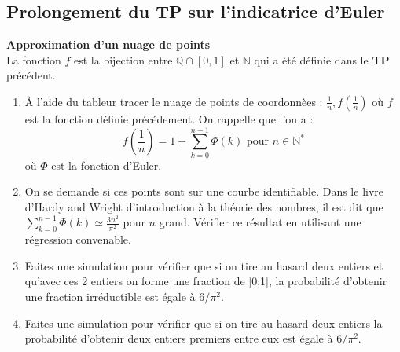 \documentclass[a4paper,11pt]{book}
\newcommand{\Q}{{\mathbb{Q}}}
\newcommand{\N}{{\mathbb{N}}}
\begin{document}
\subsection{Prolongement du {\bf TP} sur l'indicatrice d'Euler}
{\bf Approximation d'un nuage de points} \\
La fonction $f$ est la bijection entre $\Q \cap [0,1]$ et $\N$ qui a \`et\'e 
d\'efinie dans le {\bf TP} pr\'ec\'edent.
\begin{enumerate}
\item \`A l'aide du tableur tracer le nuage de points de coordonn\`ees :
$\displaystyle \frac{1}{n},f(\frac{1}{n})$ o\`u $f$ est la fonction d\'efinie 
pr\'ec\'edement. On rappelle que l'on a :\\
$$f(\frac{1}{n})=1+\sum_{k=0}^{n-1}\Phi(k) \mbox{ pour } n\in \N^*$$
o\`u $\Phi$ est la fonction d'Euler.
\item On se demande si ces points sont sur une courbe identifiable. Dans le 
livre d'Hardy and Wright d'introduction \`a la th\'eorie des nombres, il est 
dit que $\displaystyle \sum_{k=0}^{n-1}\Phi(k)\simeq \frac{3n^2}{\pi^2}$ pour 
$n$ grand. V\'erifier ce r\'esultat en utilisant une r\'egression convenable.
\item Faites une simulation pour v\'erifier que si on tire au hasard deux 
entiers et qu'avec ces 2 entiers on forme une fraction  de ]0;1], la 
probabilit\'e d'obtenir une fraction irr\'eductible est \'egale \`a $6/\pi^2$.
\item Faites une simulation pour v\'erifier que si on tire au hasard deux 
entiers la probabilit\'e d'obtenir deux entiers premiers entre eux est \'egale 
\`a $6/\pi^2$.
\end{enumerate}
\end{document}
